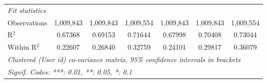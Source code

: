 \begin{table}[htbp]
\begin{threeparttable}[b]
\begin{tabular}{lcccccc}
         \midrule
         \emph{Fit statistics}\\
         Observations                   & 1,009,843        & 1,009,843        & 1,009,554        & 1,009,843        & 1,009,843        & 1,009,554\\  
         R$^2$                          & 0.67368          & 0.69153          & 0.71644          & 0.67998          & 0.70408          & 0.73044\\  
         Within R$^2$                   & 0.22607          & 0.26840          & 0.32759          & 0.24101          & 0.29817          & 0.36079\\  
         \midrule \midrule
         \multicolumn{7}{l}{\emph{Clustered (User id) co-variance matrix, 95\% confidence intervals in brackets}}\\
         \multicolumn{7}{l}{\emph{Signif. Codes: ***: 0.01, **: 0.05, *: 0.1}}\\
      \end{tabular}
   \end{threeparttable}
\end{table}


